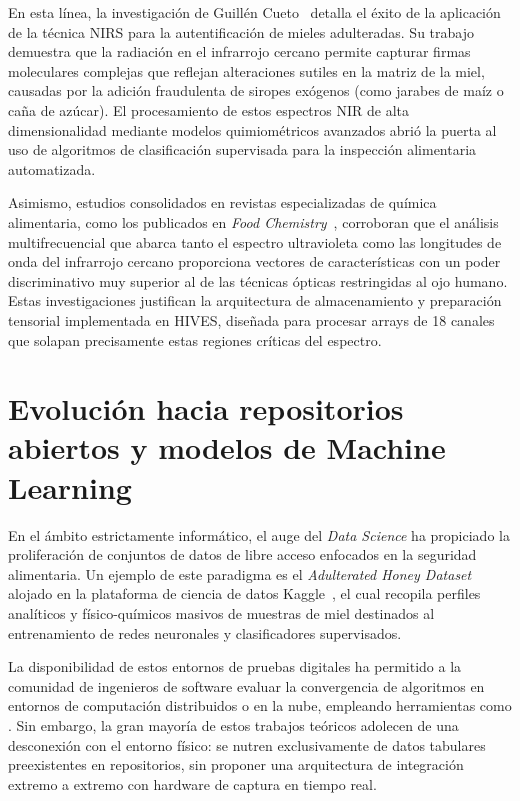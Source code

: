 En esta línea, la investigación de Guillén Cueto~\cite{guillen2017nirs} detalla el éxito de la aplicación de la técnica NIRS para la autentificación de mieles adulteradas. Su trabajo demuestra que la radiación en el infrarrojo cercano permite capturar firmas moleculares complejas que reflejan alteraciones sutiles en la matriz de la miel, causadas por la adición fraudulenta de siropes exógenos (como jarabes de maíz o caña de azúcar). El procesamiento de estos espectros NIR de alta dimensionalidad mediante modelos quimiométricos avanzados abrió la puerta al uso de algoritmos de clasificación supervisada para la inspección alimentaria automatizada.

Asimismo, estudios consolidados en revistas especializadas de química alimentaria, como los publicados en \textit{Food Chemistry}~\cite{sciencedirect_espectro_miel}, corroboran que el análisis multifrecuencial que abarca tanto el espectro ultravioleta como las longitudes de onda del infrarrojo cercano proporciona vectores de características con un poder discriminativo muy superior al de las técnicas ópticas restringidas al ojo humano. Estas investigaciones justifican la arquitectura de almacenamiento y preparación tensorial implementada en HIVES, diseñada para procesar arrays de 18 canales que solapan precisamente estas regiones críticas del espectro.

\section{Evolución hacia repositorios abiertos y modelos de Machine Learning}

En el ámbito estrictamente informático, el auge del \textit{Data Science} ha propiciado la proliferación de conjuntos de datos de libre acceso enfocados en la seguridad alimentaria. Un ejemplo de este paradigma es el \textit{Adulterated Honey Dataset} alojado en la plataforma de ciencia de datos Kaggle~\cite{generic_honey_dataset_kaggle}, el cual recopila perfiles analíticos y físico-químicos masivos de muestras de miel destinados al entrenamiento de redes neuronales y clasificadores supervisados.

La disponibilidad de estos entornos de pruebas digitales ha permitido a la comunidad de ingenieros de software evaluar la convergencia de algoritmos en entornos de computación distribuidos o en la nube, empleando herramientas como . Sin embargo, la gran mayoría de estos trabajos teóricos adolecen de una desconexión con el entorno físico: se nutren exclusivamente de datos tabulares preexistentes en repositorios, sin proponer una arquitectura de integración extremo a extremo con hardware de captura en tiempo real.

